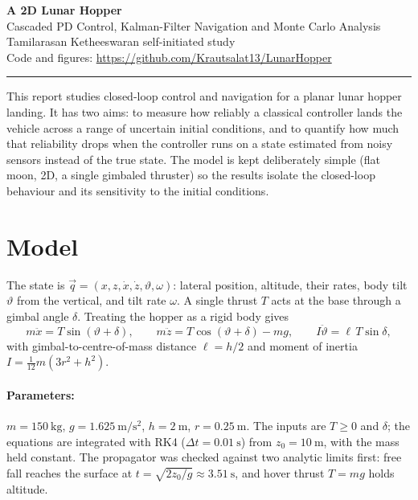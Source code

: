 \documentclass[11pt]{article}
\begin{document}
\begin{center}
  {\LARGE\bfseries A 2D Lunar Hopper}\\[3pt]
  {\large Cascaded PD Control, Kalman-Filter Navigation and Monte Carlo Analysis}\\[6pt]
  {\normalsize Tamilarasan Ketheeswaran \quad\textbar\quad self-initiated study \quad\textbar{}}\\[4pt]
  {\small Code and figures: \url{https://github.com/Krautsalat13/LunarHopper}}
\end{center}
\vspace{1pt}\hrule\vspace{6pt}

This report studies closed-loop control and navigation for a planar lunar hopper landing. It has two aims: to measure how reliably a classical controller lands the vehicle across a range of uncertain initial conditions, and to quantify how much that reliability drops when the controller runs on a state estimated from noisy sensors instead of the true state. The model is kept deliberately simple (flat moon, 2D, a single gimbaled thruster) so the results isolate the closed-loop behaviour and its sensitivity to the initial conditions.

\section*{Model}
The state is $\vec q=(x,z,\dot x,\dot z,\vartheta,\omega)$: lateral position, altitude, their rates, body tilt $\vartheta$ from the vertical, and tilt rate $\omega$. A single thrust $T$ acts at the base through a gimbal angle $\delta$. Treating the hopper as a rigid body gives
\begin{equation}
  m\ddot x = T\sin(\vartheta+\delta),\qquad
  m\ddot z = T\cos(\vartheta+\delta)-mg,\qquad
  I\ddot\vartheta = \ell\,T\sin\delta ,
\end{equation}
with gimbal-to-centre-of-mass distance $\ell=h/2$ and moment of inertia $I=\tfrac{1}{12}m(3r^2+h^2)$.

\paragraph{Parameters:} $m=150~\mathrm{kg}$, $g=1.625~\mathrm{m/s^2}$, $h=2~\mathrm{m}$, $r=0.25~\mathrm{m}$. The inputs are $T\ge 0$ and $\delta$; the equations are integrated with RK4 ($\Delta t=0.01~\mathrm{s}$) from $z_0=10~\mathrm{m}$, with the mass held constant. The propagator was checked against two analytic limits first: free fall reaches the surface at $t=\sqrt{2z_0/g}\approx3.51~\mathrm{s}$, and hover thrust $T=mg$ holds altitude.
\end{document}
